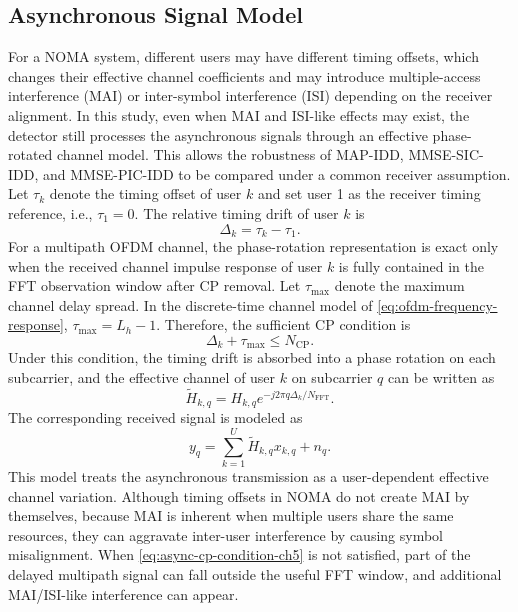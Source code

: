 \subsection{Asynchronous Signal Model}

For a NOMA system, different users may have different timing offsets, which changes their effective channel coefficients and may introduce multiple-access interference (MAI) or inter-symbol interference (ISI) depending on the receiver alignment. In this study, even when MAI and ISI-like effects may exist, the detector still processes the asynchronous signals through an effective phase-rotated channel model. This allows the robustness of MAP-IDD, MMSE-SIC-IDD, and MMSE-PIC-IDD to be compared under a common receiver assumption. Let $\tau_k$ denote the timing offset of user $k$ and set user 1 as the receiver timing reference, i.e., $\tau_1=0$. The relative timing drift of user $k$ is
\begin{equation}
    \Delta_k
    =
    \tau_k-\tau_1 .
\end{equation}
For a multipath OFDM channel, the phase-rotation representation is exact only when the received channel impulse response of user $k$ is fully contained in the FFT observation window after CP removal. Let $\tau_{\max}$ denote the maximum channel delay spread. In the discrete-time channel model of \eqref{eq:ofdm-frequency-response}, $\tau_{\max}=L_h-1$. Therefore, the sufficient CP condition is
\begin{equation}
    \Delta_k+\tau_{\max}
    \leq
    N_{\mathrm{CP}} .
    \label{eq:async-cp-condition-ch5}
\end{equation}
Under this condition, the timing drift is absorbed into a phase rotation on each subcarrier, and the effective channel of user $k$ on subcarrier $q$ can be written as
\begin{equation}
    \tilde{H}_{k,q}
    =
    H_{k,q}
    e^{-j2\pi q\Delta_k/N_{\mathrm{FFT}}}.
    \label{eq:async-phase-rotation-ch5}
\end{equation}
The corresponding received signal is modeled as
\begin{equation}
    y_q
    =
    \sum_{k=1}^{U}
    \tilde{H}_{k,q}x_{k,q}
    +
    n_q .
    \label{eq:async-ofdm-received-ch5}
\end{equation}
This model treats the asynchronous transmission as a user-dependent effective channel variation. Although timing offsets in NOMA do not create MAI by themselves, because MAI is inherent when multiple users share the same resources, they can aggravate inter-user interference by causing symbol misalignment. When \eqref{eq:async-cp-condition-ch5} is not satisfied, part of the delayed multipath signal can fall outside the useful FFT window, and additional MAI/ISI-like interference can appear.

